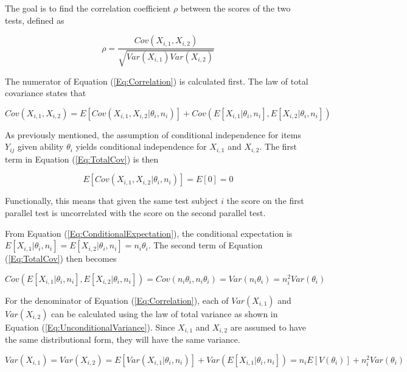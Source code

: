 \documentclass[12pt,epsfig]{article}
\begin{document}
The goal is to find the correlation coefficient $\rho$ between the scores of the two tests, defined as


\begin{equation}
\rho = \dfrac{Cov(X_{i,1}, X_{i,2})}{\sqrt{Var(X_{i,1})Var(X_{i,2})}}
\label{Eq:Correlation}
\end{equation}


\noindent The numerator of Equation (\ref{Eq:Correlation}) is calculated first. The law of total covariance states that


\begin{equation}
Cov(X_{i,1}, X_{i,2}) = E[Cov(X_{i,1}, X_{i,2} | \theta_i, n_i)] + Cov(E[X_{i,1} | \theta_i, n_i], E[X_{i,2} | \theta_i, n_i]) 
\label{Eq:TotalCov}
\end{equation} 


\noindent As previously mentioned, the assumption of conditional independence for items $Y_{ij}$ given ability $\theta_i$ yields conditional independence for $X_{i,1}$ and $X_{i,2}$. The first term in Equation (\ref{Eq:TotalCov}) is then


 \begin{equation*}
E[Cov( X_{i,1},  X_{i,2} | \theta_i, n_i)] = E[0] = 0
\end{equation*}


\noindent Functionally, this means that given the same test subject $i$ the score on the first parallel test is uncorrelated with the score on the second parallel test. 

From Equation (\ref{Eq:ConditionalExpectation}), the conditional expectation is $E[ X_{i,1} | \theta_i, n_i] = E[ X_{i,2} | \theta_i, n_i] = n_i \theta_i$. The second term of Equation (\ref{Eq:TotalCov}) then becomes


\begin{equation*}
Cov(E[ X_{i,1} | \theta_i, n_i], E[ X_{i,2} | \theta_i, n_i]) = Cov\left(n_i \theta_i, n_i  \theta_i\right) = Var\left(n_i \theta_i\right) = n_i^2 Var(\theta_i)
\end{equation*}


For the denominator of Equation (\ref{Eq:Correlation}), each of $Var(X_{i,1})$ and  $Var(X_{i,2})$ can be calculated using the law of total variance as shown in Equation (\ref{Eq:UnconditionalVariance}). Since $X_{i,1}$ and $X_{i,2}$ are assumed to have the same distributional form, they will have the same variance.

\begin{equation*}
Var(X_{i,1}) = Var(X_{i,2})  = E[Var(X_{i,1} | \theta_i, n_i)] + Var(E[X_{i,1} | \theta_i, n_i]) =  n_i E[V(\theta_i)] +  n_i^2 Var(\theta_i)
\end{equation*}
\end{document}
